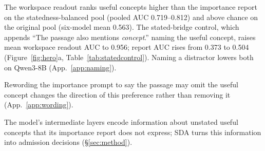 The workspace readout ranks useful concepts higher than the importance report on the statedness-balanced pool (pooled AUC 0.719--0.812) and above chance on the original pool (six-model mean 0.563). The stated-bridge control, which appends ``The passage also mentions \emph{concept}.'' naming the useful concept, raises mean workspace readout AUC to 0.956; report AUC rises from 0.373 to 0.504 (Figure~\ref{fig:hero}a, Table~\ref{tab:statedcontrol}). Naming a distractor lowers both on Qwen3-8B (App.~\ref{app:naming}).

Rewording the importance prompt to say the passage may omit the useful concept changes the direction of this preference rather than removing it (App.~\ref{app:wording}).

The model's intermediate layers encode information about unstated useful concepts that its importance report does not express; SDA turns this information into admission decisions (\S\ref{sec:method}).
